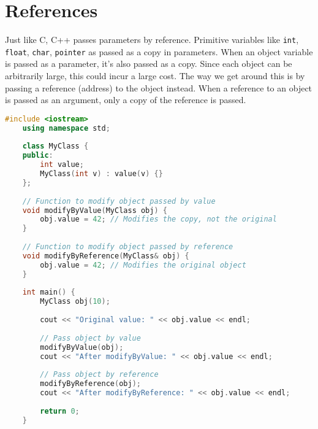 \section{References}
Just like C, C++ passes parameters by reference. 
Primitive variables like \texttt{int}, 
\texttt{float}, \texttt{char}, \texttt{pointer} 
as passed as a copy in parameters. When an 
object variable is passed as a parameter, it's 
also passed as a copy. Since each object can be 
arbitrarily large, this could incur a large cost. 
The way we get around this is by passing a 
reference (address) to the object instead. 
When a reference to an object is passed as an argument, only a copy of
the reference is passed. 

\begin{lstlisting}[language=C++, caption={Passing Objects by Value and Reference}]
    #include <iostream>
    using namespace std;
    
    class MyClass {
    public:
        int value;
        MyClass(int v) : value(v) {}
    };
    
    // Function to modify object passed by value
    void modifyByValue(MyClass obj) {
        obj.value = 42; // Modifies the copy, not the original
    }
    
    // Function to modify object passed by reference
    void modifyByReference(MyClass& obj) {
        obj.value = 42; // Modifies the original object
    }
    
    int main() {
        MyClass obj(10);
    
        cout << "Original value: " << obj.value << endl;
    
        // Pass object by value
        modifyByValue(obj);
        cout << "After modifyByValue: " << obj.value << endl;
    
        // Pass object by reference
        modifyByReference(obj);
        cout << "After modifyByReference: " << obj.value << endl;
    
        return 0;
    }
\end{lstlisting}
    